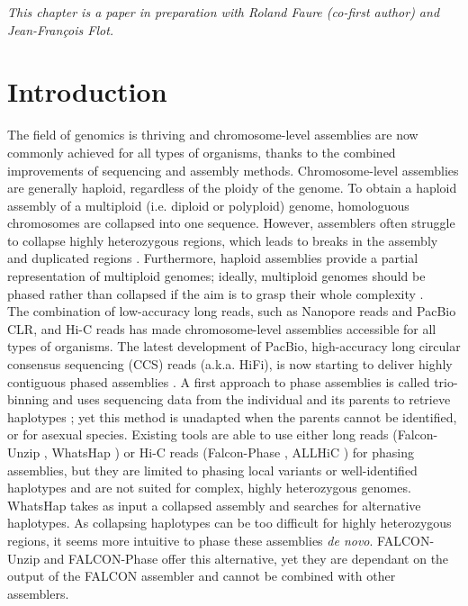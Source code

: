 %

\textit{This chapter is a paper in preparation with Roland Faure (co-first author) and Jean-François Flot.}

\section{Introduction}

The field of genomics is thriving and chromosome-level assemblies are now commonly achieved for all types of organisms, thanks to the combined improvements of sequencing and assembly methods. Chromosome-level assemblies are generally haploid, regardless of the ploidy of the genome. To obtain a haploid assembly of a multiploid (i.e. diploid or polyploid) genome, homologuous chromosomes are collapsed into one sequence. However, assemblers often struggle to collapse highly heterozygous regions, which leads to breaks in the assembly and duplicated regions \cite{guiglielmoni2020}. Furthermore, haploid assemblies provide a partial representation of multiploid genomes; ideally, multiploid genomes should be phased rather than collapsed if the aim is to grasp their whole complexity \cite{unzipping}.\\

The combination of low-accuracy long reads, such as Nanopore reads and PacBio CLR, and Hi-C reads has made chromosome-level assemblies accessible for all types of organisms. The latest development of PacBio, high-accuracy long circular consensus sequencing (CCS) reads (a.k.a. HiFi), is now starting to deliver highly contiguous phased assemblies \cite{flye,hifiasm,hicanu}. A first approach to phase assemblies is called trio-binning and uses sequencing data from the individual and its parents to retrieve haplotypes \cite{triocanu}; yet this method is unadapted when the parents cannot be identified, or for asexual species. Existing tools are able to use either long reads (Falcon-Unzip \cite{falcon-unzip}, WhatsHap \cite{whatshap}) or Hi-C reads (Falcon-Phase \cite{falcon-phase}, ALLHiC \cite{allhic}) for phasing assemblies, but they are limited to phasing local variants or well-identified haplotypes and are not suited for complex, highly heterozygous genomes. WhatsHap takes as input a collapsed assembly and searches for alternative haplotypes. As collapsing haplotypes can be too difficult for highly heterozygous regions, it seems more intuitive to phase these assemblies \textit{de novo}. FALCON-Unzip and FALCON-Phase offer this alternative, yet they are dependant on the output of the FALCON assembler and cannot be combined with other assemblers. \\

